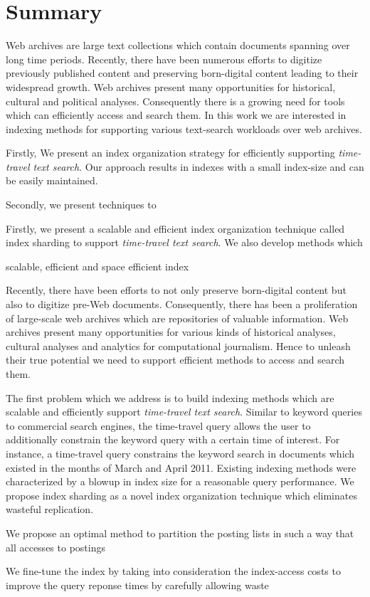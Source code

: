 \chapter*{Summary}

Web archives are large text collections which contain documents spanning over long time periods. Recently, there have been numerous efforts to digitize previously published content and preserving born-digital content leading to their widespread growth. Web archives present many opportunities for historical, cultural and political analyses. Consequently there is a growing need for tools which can efficiently access and search them. In this work we are interested in indexing methods for supporting various text-search workloads over web archives.   

Firstly, We present an index organization strategy for efficiently supporting \emph{time-travel text search}. Our approach results in indexes with a small index-size and can be easily maintained.

Secondly, we present techniques to 

Firstly, we present a scalable and efficient index organization technique called index sharding to support \emph{time-travel text search}. We also develop methods which 

scalable, efficient and space efficient index  

Recently, there have been efforts to not only preserve born-digital content but also to digitize pre-Web documents. Consequently, there has been a proliferation of large-scale web archives which are repositories of valuable information. Web archives present many opportunities for various kinds of historical analyses, cultural analyses and analytics for computational journalism. Hence to unleash their true potential we need to support efficient methods to access and search them. 

The first problem which we address is to build indexing methods which are scalable and efficiently support \emph{time-travel text search}. Similar to keyword queries to commercial search engines, the time-travel query allows the user to additionally constrain the keyword query with a certain time of interest. For instance, a time-travel query  constrains the keyword search in documents which existed in the months of March and April 2011. Existing indexing methods were characterized by a blowup in index size for a reasonable query performance. We propose index sharding as a novel index organization technique which eliminates wasteful replication. 

We propose an optimal method to partition the posting lists in such a way that all accesses to postings

We fine-tune the index by taking into consideration the index-access costs to improve the query reponse times by carefully allowing waste
